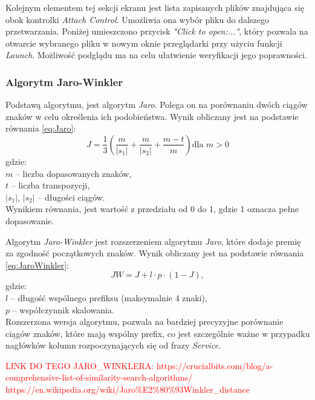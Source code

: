 Kolejnym elementem tej sekcji ekranu jest lista zapisanych plików znajdująca się obok kontrolki \emph{Attach Control}. Umożliwia ona wybór pliku do dalszego przetwarzania. Poniżej umieszczono przycisk \emph{"Click to open:..."}, który pozwala na otwarcie wybranego pliku w nowym oknie przeglądarki przy użyciu funkcji \emph{Launch}. Możliwość podglądu ma na celu ułatwienie weryfikacji jego poprawności.

\subsubsection*{Algorytm Jaro-Winkler}
Podstawą algorytmu, jest algorytm \emph{Jaro}. Polega on na porównaniu dwóch ciągów znaków w celu określenia ich podobieństwa. Wynik obliczany jest na podstawie równania \ref{eq:Jaro}:
\begin{equation}
    \label{eq:Jaro}
    J = \frac{1}{3} \left( \frac{m}{|s_1|} + \frac{m}{|s_2|} + \frac{m - t}{m} \right) \mbox{dla } m>0
\end{equation}
\noindent gdzie:\\
$m$ – liczba dopasowanych znaków,\\    $t$ – liczba transpozycji,\\    $|s_1|$, $|s_2|$ – długości ciągów.\\

\noindent Wynikiem równania, jest wartość z przedziału od 0 do 1, gdzie 1 oznacza pełne dopasowanie. 

Algorytm \emph{Jaro-Winkler} jest rozszerzeniem algorytmu \emph{Jaro}, które dodaje premię za zgodność początkowych znaków. Wynik obliczany jest na podstawie równania \ref{eq:JaroWinkler}:
\begin{equation}
    \label{eq:JaroWinkler}
    JW = J + l \cdot p \cdot (1 - J),
\end{equation}
gdzie:\\
$l$ – długość wspólnego prefiksu (maksymalnie 4 znaki),\\ $p$ – współczynnik skalowania.\\

\noindent Rozszerzona wersja algorytmu, pozwala na bardziej precyzyjne porównanie ciągów znaków, które mają wspólny prefix, co jest szczególnie ważne w przypadku nagłówków kolumn rozpoczynających się od frazy \emph{Service}.


\vspace{1cm}

\textcolor{red}{LINK DO TEGO JARO\_WINKLERA: https://crucialbits.com/blog/a-comprehensive-list-of-similarity-search-algorithms/
https://en.wikipedia.org/wiki/Jaro\%E2\%80\%93Winkler\_distance
}


